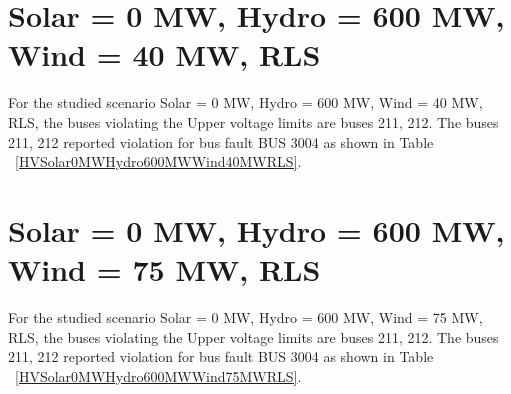 \documentclass[10pt]{report}
\begin{document}
\section{Solar = 0 MW, Hydro = 600 MW, Wind = 40 MW, RLS}
For the studied scenario Solar = 0 MW, Hydro = 600 MW, Wind = 40 MW, RLS, the buses violating the Upper voltage limits are buses 211, 212.
The buses 211, 212 reported violation for bus fault BUS 3004 as shown in Table ~\ref{HVSolar0MWHydro600MWWind40MWRLS}.
\begin{table}[H]
\caption{Contingencies reporting bus voltages greater than emergency voltage of 1.1 PU for scenario Solar = 0 MW, Hydro = 600 MW, Wind = 40 MW, RLS}
\label{HVSolar0MWHydro600MWWind40MWRLS}
\centering
{}
\end{table}


\section{Solar = 0 MW, Hydro = 600 MW, Wind = 75 MW, RLS}
For the studied scenario Solar = 0 MW, Hydro = 600 MW, Wind = 75 MW, RLS, the buses violating the Upper voltage limits are buses 211, 212.
The buses 211, 212 reported violation for bus fault BUS 3004 as shown in Table ~\ref{HVSolar0MWHydro600MWWind75MWRLS}.
\begin{table}[H]
\caption{Contingencies reporting bus voltages greater than emergency voltage of 1.1 PU for scenario Solar = 0 MW, Hydro = 600 MW, Wind = 75 MW, RLS}
\label{HVSolar0MWHydro600MWWind75MWRLS}
\centering
{}
\end{table}
\end{document}
